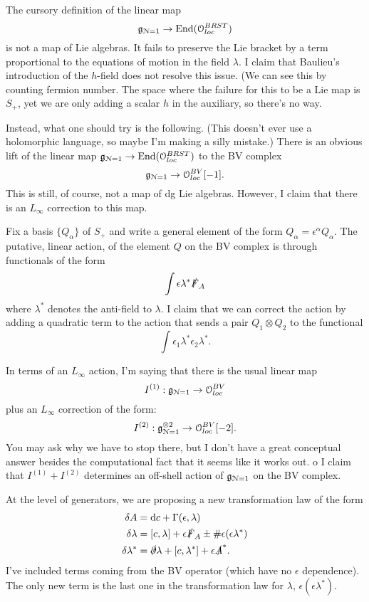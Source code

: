\documentclass[10pt, oneside]{article}
\renewcommand{\d}{\mathrm{d}}
\begin{document}
\def\cN{\mathcal{N}}

The cursory definition of the linear map
\[
\mf g_{\cN=1} \to {\rm End}(\oloc^{BRST})
\]
is not a map of Lie algebras. 
It fails to preserve the Lie bracket by a term proportional to the equations of motion in the field $\lambda$. 
I claim that Baulieu's introduction of the $h$-field does not resolve this issue. (We can see this by counting fermion number. 
The space where the failure for this to be a Lie map is $S_+$, yet we are only adding a scalar $h$ in the auxiliary, so there's no way.

Instead, what one should try is the following. 
(This doesn't ever use a holomorphic language, so maybe I'm making a silly mistake.)
There is an obvious lift of the linear map $\mf g_{\cN=1} \to {\rm End}(\oloc^{BRST})$ to the BV complex
\[
\mf g_{\cN=1} \to \oloc^{BV} [-1] .
\]
This is still, of course, not a map of dg Lie algebras.
However, I claim that there is an $L_\infty$ correction to this map. 

Fix a basis $\{Q_\alpha\}$ of $S_+$ and write a general element of the form $Q_{\alpha} = \epsilon^\alpha Q_\alpha$.
The putative, linear action, of the element $Q$ on the BV complex is through functionals of the form
\[
\int \epsilon \lambda^* \slashed{F}_A 
\]
where $\lambda^*$ denotes the anti-field to $\lambda$. 
I claim that we can correct the action by adding a quadratic term to the action that sends a pair $Q_1 \otimes Q_2$ to the functional
\[
\int \epsilon_1 \lambda^* \epsilon_2 \lambda^*  .
\] 

In terms of an $L_\infty$ action, I'm saying that there is the usual linear map
\[
I^{(1)} : \mf g_{\cN=1} \to \oloc^{BV} 
\]
plus an $L_\infty$ correction of the form:
\[
I^{(2)} : \mf g_{\cN=1}^{\otimes 2} \to \oloc^{BV} [-2]  .
\]
You may ask why we have to stop there, but I don't have a great conceptual answer besides the computational fact that it seems like it works out. o
I claim that $I^{(1)} + I^{(2)}$ determines an off-shell action of $\mf g_{\cN=1}$ on the BV complex. 

At the level of generators, we are proposing a new transformation law of the form 
\begin{align*}
\delta A &= \d c + \Gamma(\epsilon,\lambda) \\
\delta \lambda &= [c,\lambda] + \epsilon \sd F_A  \pm \# \epsilon (\epsilon \lambda^*)  \\
\delta \lambda^* &= \sd \partial \lambda + [c, \lambda^*] + \epsilon \sd A^*  .
\end{align*}
I've included terms coming from the BV operator (which have no $\epsilon$ dependence). 
The only new term is the last one in the transformation law for $\lambda$, $\epsilon (\epsilon \lambda^*)$. 
\end{document}
